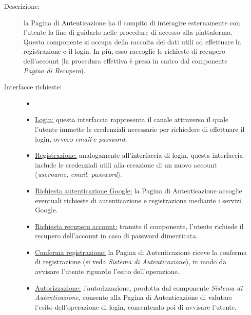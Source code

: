 \documentclass[11pt, a4paper]{article}
\theoremstyle{definition} %
\begin{document}
\begin{description}
    \item[Descrizione:] la Pagina di Autenticazione ha il compito
    di interagire esternamente con l'utente la fine di guidarlo nelle
    procedure di accesso alla piattaforma. Questo componente si occupa della
    raccolta dei dati utili ad effettuare la registrazione e il
    login. In più, esso raccoglie le richieste di recupero dell'account
    (la procedura effettiva è presa in carico dal componente
    \textit{Pagina di Recupero}).

    \item[Interfacce richieste:]
    \begin{itemize}
        \item[]

        \item \underline{Login:} questa interfaccia rappresenta
        il canale attraverso il quale l'utente immette le credenziali
        necessarie per richiedere di effettuare il login, ovvero
        \textit{email} e \textit{password}.

        \item \underline{Registrazione:} analogamente all'interfaccia
        di login, questa interfaccia include le credenziali utili alla
        creazione di un nuovo account (\textit{username, email, password}).

        \item \underline{Richiesta autenticazione Google:} la Pagina di
        Autenticazione accoglie eventuali richieste di autenticazione e
        registrazione mediante i servizi Google.

        \item \underline{Richiesta recupero account:} tramite il componente,
        l'utente richiede il recupero dell'account in caso di password
        dimenticata.

        \item \underline{Conferma registrazione:} la Pagina di Autenticazione
        riceve la conferma di registrazione (si veda \textit{Sistema di
        Autenticazione}), in modo da avvisare l'utente riguardo l'esito
        dell'operazione.

        \item \underline{Autorizzazione:} l'autorizzazione, prodotta dal
        componente \textit{Sistema di Autenticazione}, consente alla
        Pagina di Autenticazione di valutare l'esito dell'operazione di
        login, consentendo poi di avvisare l'utente.
    \end{itemize}


\end{description}
\end{document}
